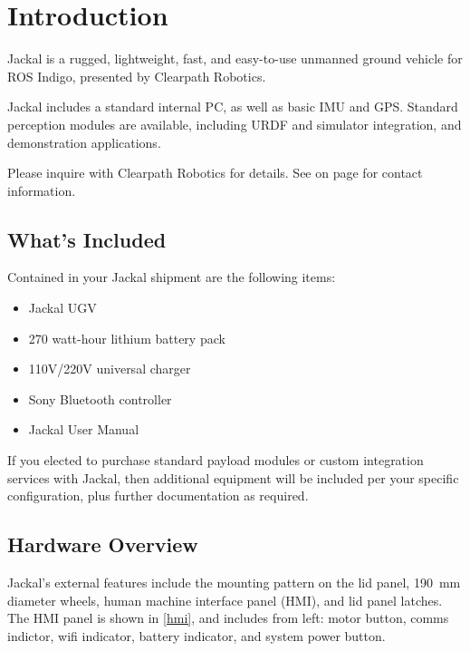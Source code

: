 \documentclass[]{clearpath-manual}
\begin{document}
\tableofcontents

\section{Introduction}

Jackal is a rugged, lightweight, fast, and easy-to-use unmanned ground vehicle for ROS
Indigo, presented by Clearpath Robotics.

Jackal includes a standard internal PC, as well as basic IMU and GPS. Standard
perception modules are available, including URDF and simulator integration, and
demonstration applications.

Please inquire with Clearpath Robotics for details. See  on page
\pageref{contact} for contact information.

\subsection{What's Included}

Contained in your Jackal shipment are the following items:

\begin{itemize}[nolistsep]
  \item Jackal UGV
  \item 270 watt-hour lithium battery pack
  \item 110V/220V universal charger
  \item Sony Bluetooth controller
  \item Jackal User Manual
\end{itemize}

If you elected to purchase standard payload modules or custom integration services with
Jackal, then additional equipment will be included per your specific configuration, plus
further documentation as required.

\subsection{Hardware Overview}

Jackal's external features include the mounting pattern on the lid panel, \SI{190}{\mm} diameter
wheels, human machine interface panel (HMI), and lid panel latches. The HMI panel is shown in
\autoref{hmi}, and includes from left: motor button, comms indictor, wifi indicator, battery
indicator, and system power button.

\end{document}
